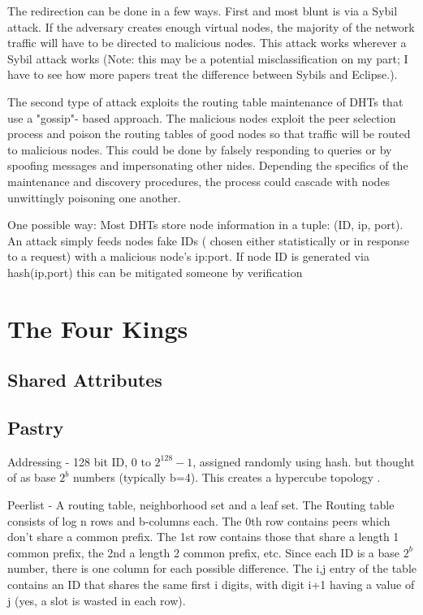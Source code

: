 \documentclass[10pt,letterpaper]{report}
\begin{document}
The redirection can be done in a few ways.  First and most blunt is via a Sybil attack.  If the adversary creates enough virtual nodes, the majority of the network traffic will have to be directed to malicious nodes.  This attack works wherever a Sybil attack works  (Note: this may be a potential  misclassification on my part; I have to see how more papers treat the difference between Sybils and Eclipse.).

The second type of attack exploits the routing table maintenance of DHTs that use a "gossip"- based approach.  The malicious nodes exploit the peer selection process and poison the routing tables of good nodes so that traffic will be routed to malicious nodes.  This could be done by falsely responding to queries or by spoofing messages and impersonating other nides.   Depending the specifics of  the maintenance and discovery procedures,  the process could cascade with nodes unwittingly poisoning one another.

One possible way:  Most DHTs store node information in a tuple: (ID, ip, port).  An attack simply feeds nodes fake IDs ( chosen either statistically or in response to a request) with a malicious node's ip:port.  If node ID is generated via hash(ip,port)  this can be mitigated someone by verification  




\chapter{The Four Kings}%

\section*{Shared Attributes}


\section{Pastry}

Addressing - 128 bit ID, 0 to $2^128 -1$, assigned randomly using hash.   but thought of as base $2^b$ numbers (typically b=4).  This creates a hypercube topology \cite{induced}.

Peerlist  -   A routing table, neighborhood set and a leaf set.  The Routing table consists of log n rows and  b-columns each.  The 0th row contains peers which don't share a common prefix.  The 1st row contains those that share a length 1 common prefix, the 2nd a length 2 common prefix, etc.  Since each ID is a base $2^b$ number, there is one column for each possible difference.   The i,j entry of the table contains an ID that shares the same first i digits, with digit i+1 having a value of j (yes, a slot is wasted in each row).
\end{document}
